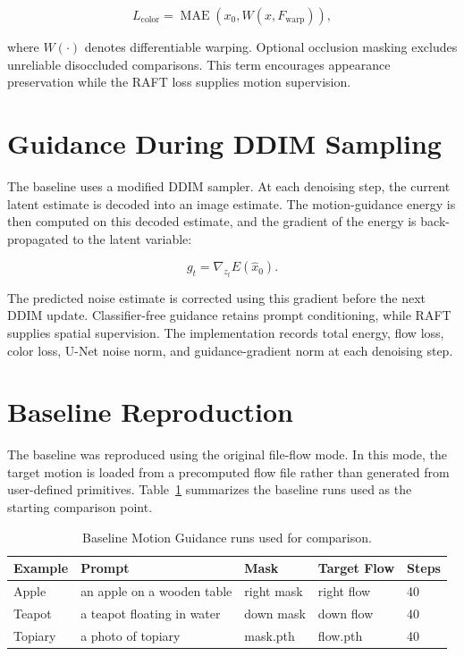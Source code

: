 \begin{equation}
L_{\mathrm{color}} = \operatorname{MAE}\left(x_0,W(x,F_{\mathrm{warp}})\right),
\end{equation}

where $W(\cdot)$ denotes differentiable warping. Optional occlusion masking excludes unreliable disoccluded comparisons. This term encourages appearance preservation while the RAFT loss supplies motion supervision.

\section{Guidance During DDIM Sampling}

The baseline uses a modified DDIM sampler. At each denoising step, the current latent estimate is decoded into an image estimate. The motion-guidance energy is then computed on this decoded estimate, and the gradient of the energy is back-propagated to the latent variable:

\begin{equation}
g_t = \nabla_{z_t} E(\hat{x}_0).
\end{equation}

The predicted noise estimate is corrected using this gradient before the next DDIM update. Classifier-free guidance retains prompt conditioning, while RAFT supplies spatial supervision. The implementation records total energy, flow loss, color loss, U-Net noise norm, and guidance-gradient norm at each denoising step.

\section{Baseline Reproduction}

The baseline was reproduced using the original file-flow mode. In this mode, the target motion is loaded from a precomputed flow file rather than generated from user-defined primitives. Table~\ref{tab:baseline-runs} summarizes the baseline runs used as the starting comparison point.

\begin{table}[t]
  \caption{Baseline Motion Guidance runs used for comparison.}
  \centering
  \small
  \begin{tabular}{p{0.75in}|p{1.45in}|p{0.85in}|p{0.75in}|p{0.45in}}
    \hline
    Example & Prompt & Mask & Target Flow & Steps \\ \hline \hline
    Apple & an apple on a wooden table & right mask & right flow & 40 \\ \hline
    Teapot & a teapot floating in water & down mask & down flow & 40 \\ \hline
    Topiary & a photo of topiary & mask.pth & flow.pth & 40 \\ \hline
  \end{tabular}
  \label{tab:baseline-runs}
\end{table}


